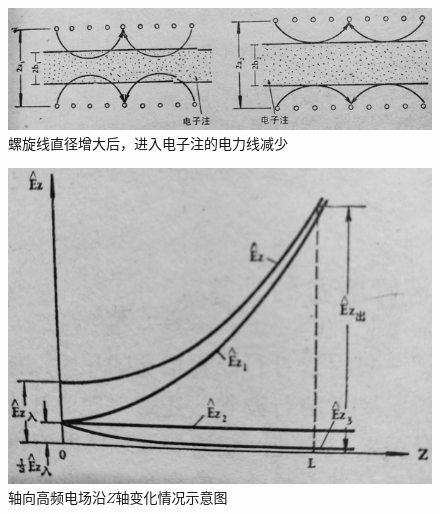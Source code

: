\begin{figure}[phtb]
	\centering
	\includegraphics[width=0.65\linewidth]{figure/ch4-2}
	\caption{螺旋线直径增大后，进入电子注的电力线减少}
	\label{ch4-2}
\end{figure}

\begin{figure}[phtb]
	\centering
	\includegraphics[width=0.65\linewidth]{figure/ch4-3}
	\caption{轴向高频电场沿$ Z $轴变化情况示意图}
	\label{ch4-3}
\end{figure}






